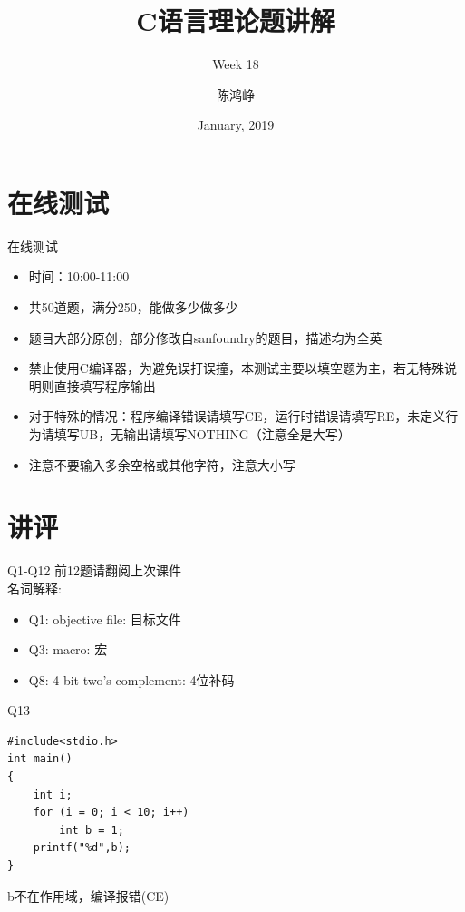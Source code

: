 \documentclass{myslide}
\title{C语言理论题讲解}
\subtitle{Week 18}
\author[chhzh123]{陈鸿峥}
\date[Jan, 2019]{January, 2019}
\begin{document}
\begin{frame}
\titlepage
\end{frame}

\begin{frame}
\tableofcontents[subsectionstyle=show]
\end{frame}

\section{在线测试}
\begin{frame}
\sectionpage
\end{frame}

\begin{frame}{在线测试}
\begin{itemize}
	\item 时间：10:00-11:00
	\item 共50道题，满分250，能做多少做多少
	\item 题目大部分原创，部分修改自sanfoundry的题目，描述均为全英
	\item 禁止使用C编译器，为避免误打误撞，本测试主要以填空题为主，若无特殊说明则直接填写程序输出
	\item 对于特殊的情况：程序编译错误请填写CE，运行时错误请填写RE，未定义行为请填写UB，无输出请填写NOTHING（注意全是大写）
	\item 注意不要输入多余空格或其他字符，注意大小写
\end{itemize}
\end{frame}

\section{讲评}
\begin{frame}
\sectionpage
\end{frame}

\begin{frame}{Q1-Q12}
前12题请翻阅上次课件\\
名词解释:
\begin{itemize}
	\item Q1: objective file: 目标文件
	\item Q3: macro: 宏
	\item Q8: 4-bit two's complement: 4位补码
\end{itemize}
\end{frame}

\begin{frame}[fragile]{Q13}
\begin{lstlisting}
#include<stdio.h>
int main()
{
    int i;
    for (i = 0; i < 10; i++)
        int b = 1;
    printf("%d",b);
}
\end{lstlisting}
b不在作用域，编译报错(CE)
\end{frame}
\end{document}
